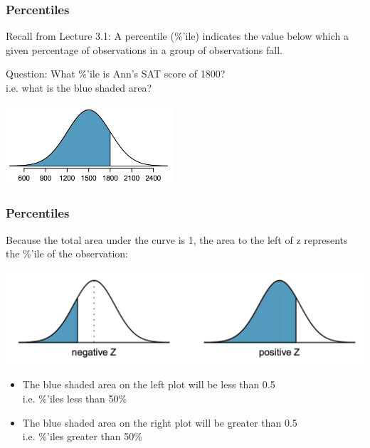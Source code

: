 \documentclass[slides]{beamer}
\newcommand{\blue}[1]{\textcolor{blue2}{#1}}
\begin{document}
\begin{frame}
\frametitle{Percentiles}

Recall from Lecture 3.1: A \blue{percentile} (\%'ile) indicates the value below which a given percentage of observations in a group of observations fall.  

\vspace{0.5cm}

\pause \blue{Question}: What \%'ile is Ann's SAT score of 1800?\\
i.e. what is the blue shaded area?  

\begin{center}
\includegraphics[height=3cm]{figure/ann_z.png}
\end{center}

\end{frame}






\begin{frame}
\frametitle{Percentiles}
Because the total area under the curve is 1, the area to the left of z represents the \%'ile of the observation:

\begin{center}
\includegraphics[width=\textwidth]{figure/pos_neg_z.png}
\end{center}

\begin{itemize}
\pause\item The blue shaded area on the left plot will be less than 0.5\\
i.e. \%'iles less than 50\%  
\pause\item The blue shaded area on the right plot will be greater than 0.5\\
i.e. \%'iles greater than 50\%  
\end{itemize}

\end{frame}
\end{document}
